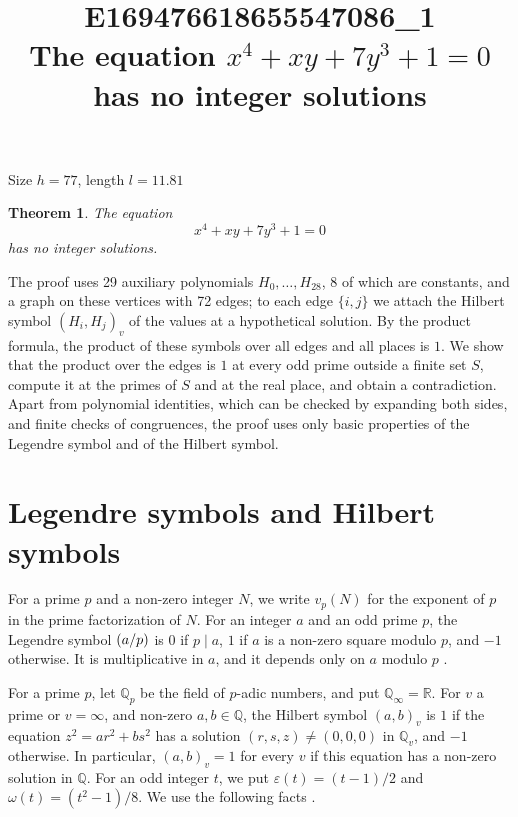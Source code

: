 \documentclass[11pt]{article}
\title{\textbf{E169476618655547086\_1}\\[4pt] {\Large The equation $x^{4}+xy+7y^{3}+1=0$ has no integer solutions}}
\author{}
\date{}
\newtheorem{theorem}{Theorem}
\newcommand{\Q}{\mathbb{Q}}
\newcommand{\leg}[2]{\mathchoice{\biggl(\dfrac{#1}{#2}\biggr)}{(#1/#2)}{(#1/#2)}{(#1/#2)}}
\begin{document}
\maketitle
\vspace{-8ex}
\begin{center}
Size $h=77$, length $l=11.81$
\end{center}

\begin{theorem}\label{thm:main}
The equation
\begin{equation}\label{eq:main}
x^{4}+xy+7y^{3}+1=0
\end{equation}
has no integer solutions.
\end{theorem}

The proof uses 29 auxiliary polynomials $H_0,\dots,H_{28}$, 8 of which are constants, and a graph on these vertices with 72 edges; to each edge $\{i,j\}$ we attach the Hilbert symbol $(H_i,H_j)_v$ of the values at a hypothetical solution. By the product formula, the product of these symbols over all edges and all places is $1$. We show that the product over the edges is $1$ at every odd prime outside a finite set $S$, compute it at the primes of $S$ and at the real place, and obtain a contradiction. Apart from polynomial identities, which can be checked by expanding both sides, and finite checks of congruences, the proof uses only basic properties of the Legendre symbol and of the Hilbert symbol.

\section{Legendre symbols and Hilbert symbols}

For a prime $p$ and a non-zero integer $N$, we write $v_p(N)$ for the exponent of $p$ in the prime factorization of $N$. For an integer $a$ and an odd prime $p$, the Legendre symbol $\leg{a}{p}$ is $0$ if $p\mid a$, $1$ if $a$ is a non-zero square modulo $p$, and $-1$ otherwise. It is multiplicative in $a$, and it depends only on $a$ modulo $p$ \cite[Chapter~5]{IR}.

For a prime $p$, let $\Q_p$ be the field of $p$-adic numbers, and put $\Q_\infty=\mathbb R$. For $v$ a prime or $v=\infty$, and non-zero $a,b\in\Q$, the Hilbert symbol $(a,b)_v$ is $1$ if the equation $z^2=ar^2+bs^2$ has a solution $(r,s,z)\neq(0,0,0)$ in $\Q_v$, and $-1$ otherwise. In particular, $(a,b)_v=1$ for every $v$ if this equation has a non-zero solution in $\Q$. For an odd integer $t$, we put $\varepsilon(t)=(t-1)/2$ and $\omega(t)=(t^2-1)/8$. We use the following facts \cite[Chapter~III, Proposition~2 and Theorems~1 and~3]{Se}.
\end{document}
